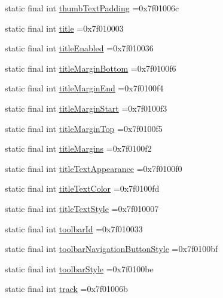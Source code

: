 \begin{DoxyCompactItemize}
static final int \hyperlink{classcheck_1_1test_1_1_r_1_1attr_a8e826d9b4743add8c93af83988130b52}{thumb\+Text\+Padding} =0x7f01006c
\item 
static final int \hyperlink{classcheck_1_1test_1_1_r_1_1attr_a002c5907c5484ce9f870aa21ac099f9b}{title} =0x7f010003
\item 
static final int \hyperlink{classcheck_1_1test_1_1_r_1_1attr_aee85e0b8f8875713f0f0ae34e9641d08}{title\+Enabled} =0x7f010036
\item 
static final int \hyperlink{classcheck_1_1test_1_1_r_1_1attr_af0ece8636a362c616b298368dbfd014f}{title\+Margin\+Bottom} =0x7f0100f6
\item 
static final int \hyperlink{classcheck_1_1test_1_1_r_1_1attr_ab9d5799591281efe884d17139689b1a0}{title\+Margin\+End} =0x7f0100f4
\item 
static final int \hyperlink{classcheck_1_1test_1_1_r_1_1attr_a09d7811f39e20d8013b4a96d09150900}{title\+Margin\+Start} =0x7f0100f3
\item 
static final int \hyperlink{classcheck_1_1test_1_1_r_1_1attr_ae16b8b538a7ee6adc4c7b58aaefb3b5c}{title\+Margin\+Top} =0x7f0100f5
\item 
static final int \hyperlink{classcheck_1_1test_1_1_r_1_1attr_a088a77fc6e1f7916d5c036ebebe5ab5c}{title\+Margins} =0x7f0100f2
\item 
static final int \hyperlink{classcheck_1_1test_1_1_r_1_1attr_a2c9b484e1413a3ab292ec0c0e06b6243}{title\+Text\+Appearance} =0x7f0100f0
\item 
static final int \hyperlink{classcheck_1_1test_1_1_r_1_1attr_a05900c2c0b61d120064a083c8e2fcc8b}{title\+Text\+Color} =0x7f0100fd
\item 
static final int \hyperlink{classcheck_1_1test_1_1_r_1_1attr_a3132c1db5fe53bffcbde427849ea7bc8}{title\+Text\+Style} =0x7f010007
\item 
static final int \hyperlink{classcheck_1_1test_1_1_r_1_1attr_a115881f8837d9e7f7a0d617a81e74f0a}{toolbar\+Id} =0x7f010033
\item 
static final int \hyperlink{classcheck_1_1test_1_1_r_1_1attr_abfae1004d8b4a81e368178f12eff90f7}{toolbar\+Navigation\+Button\+Style} =0x7f0100bf
\item 
static final int \hyperlink{classcheck_1_1test_1_1_r_1_1attr_acbe9493c0eb16a5b6b5149aab310f271}{toolbar\+Style} =0x7f0100be
\item 
static final int \hyperlink{classcheck_1_1test_1_1_r_1_1attr_a96007b76e63444b819a9c38ff1451df1}{track} =0x7f01006b
\item 

\end{DoxyCompactItemize}
